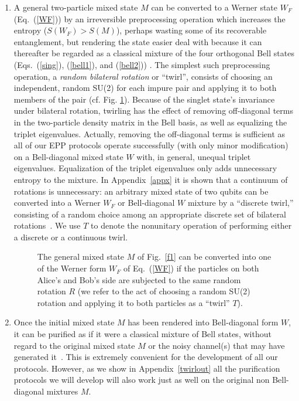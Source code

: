 \begin{enumerate}
 
\item A general two-particle mixed state $M$ can be converted to a
Werner state $W_F$ (Eq.~(\ref{WF})) by an irreversible
preprocessing operation which increases the entropy ($S(W_F)>S(M)$),
perhaps wasting some of its recoverable entanglement, but rendering
the state easier deal with because it can thereafter be regarded as a
classical mixture of the four orthogonal Bell states
(Eqs.~(\ref{sing}), (\ref{bell1}), and (\ref{bell2}))
\cite{footfef}.  The simplest
such preprocessing operation, a {\it random bilateral
rotation}\cite{purification} or ``twirl'', consists of choosing an
independent, random SU(2) for each impure pair and applying it to both
members of the pair (cf. Fig. \ref{tommy}).  Because of the singlet
state's invariance under bilateral rotation, twirling has the effect
of removing off-diagonal terms in the two-particle density matrix in
the Bell basis, as well as equalizing the triplet eigenvalues.  
Actually, removing the off-diagonal terms is sufficient
as all of our EPP protocols operate successfully (with only 
minor modification) on a Bell-diagonal mixed state $W$ with, in general,
unequal triplet eigenvalues.  Equalization
of the triplet eigenvalues only adds unnecessary entropy to the mixture.
In Appendix~\ref{appx} it is shown that a continuum of rotations is
unnecessary: an arbitrary mixed state of two qubits can be converted
into a Werner $W_F$ or Bell-diagonal $W$ mixture by a ``discrete
twirl,'' consisting of a random choice among
an appropriate discrete set of bilateral rotations~\cite{foot2}.
We use $T$ to denote the nonunitary operation of performing either a
discrete or a continuous twirl.
\label{i1}
\begin{figure}[htbp]
\centerline{}
\caption[Twirling]{The general mixed state $M$ of 
Fig.~\protect\ref{f1} can
be converted into one of the Werner form $W_F$ of
Eq.~(\protect\ref{WF}) if the particles on both Alice's and Bob's side
are subjected to the same random rotation $R$ (we refer to the act of
choosing a random SU(2) rotation and applying it to both particles as
a ``twirl'' $T$).}
\label{tommy}
\end{figure}
 
\item Once the initial mixed state $M$ has been rendered into
Bell-diagonal form $W$, it can be purified as if it were a classical
mixture of Bell states, without regard to the original mixed state $M$
or the noisy channel(s) that may have generated it~\cite{footrho}.
This is extremely convenient for the development of all
our protocols.  However, as we show in Appendix~\ref{twirlout}
all the purification protocols we will develop will also
work just as well on the original non Bell-diagonal mixtures $M$.
\label{i2}


\end{enumerate}
